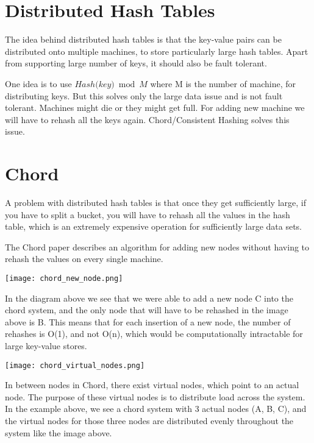 \documentclass[twoside]{article}
\begin{document}
\section{Distributed Hash Tables}

The idea behind distributed hash tables is that the key-value pairs can be distributed onto multiple machines, to store particularly large hash tables. Apart from supporting large number of keys, it should also be fault tolerant.

One idea is to use $Hash\big(key\big) \bmod M$ where M is the number of machine, for distributing keys. But this solves only the large data issue and is not fault tolerant. Machines might die or they might get full. For adding new machine we will have to rehash all the keys again. Chord/Consistent Hashing solves this issue.

\section{Chord}

A problem with distributed hash tables is that once they get sufficiently large, if you have to split a bucket, you will have to rehash all the values in the hash table, which is an extremely expensive operation for sufficiently large data sets. 

The Chord paper describes an algorithm for adding new nodes without having to rehash the values on every single machine.

\begin{center}
\texttt{[image: chord\_new\_node.png]}
\end{center}

In the diagram above we see that we were able to add a new node C into the chord system, and the only node that will have to be rehashed in the image above is B. This means that for each insertion of a new node, the number of rehashes is O(1), and not O(n), which would be computationally intractable for large key-value stores.

\begin{center}
\texttt{[image: chord\_virtual\_nodes.png]}
\end{center}

In between nodes in Chord, there exist virtual nodes, which point to an actual node. The purpose of these virtual nodes is to distribute load across the system. In the example above, we see a chord system with 3 actual nodes (A, B, C), and the virtual nodes for those three nodes are distributed evenly throughout the system like the image above. 

\nocite{*}
 

\end{document}
